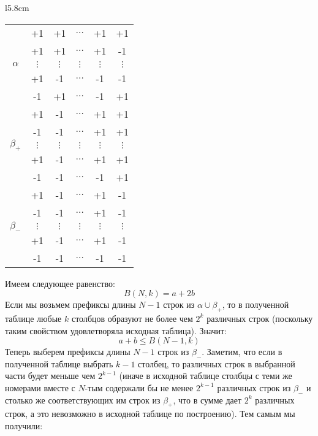 \begin{wraptable}{l}{5.8cm}
  \begin{tabular}{|c|c c c c|c|}
    \hline
    \multirow{5}{*}{$\alpha$} & +1 & +1 & $\ldots$ & +1 & +1 \\
                              & +1 & +1 & $\ldots$ & +1 & -1 \\
                              & $\vdots$ & $\vdots$ & $\vdots$ & $\vdots$ & $\vdots$ \\
                              & +1 & -1 & $\ldots$ & -1 & -1 \\
                              & -1 & +1 & $\ldots$ & -1 & +1 \\
    \hline
    \multirow{5}{*}{$\beta_+$}& +1 & -1 & $\ldots$ & +1 & +1 \\
                              & -1 & -1 & $\ldots$ & +1 & +1 \\
                              & $\vdots$ & $\vdots$ & $\vdots$ & $\vdots$& $\vdots$ \\
                              & +1 & -1 & $\ldots$ & +1 & +1 \\
                              & -1 & -1 & $\ldots$ & -1 & +1 \\
    \hline
    \multirow{5}{*}{$\beta_-$}& +1 & -1 & $\ldots$ & +1 & -1 \\
                              & -1 & -1 & $\ldots$ & +1 & -1 \\
                              & $\vdots$ & $\vdots$ & $\vdots$ & $\vdots$  & $\vdots$ \\
                              & +1 & -1 & $\ldots$ & +1 & -1 \\
                              & -1 & -1 & $\ldots$ & -1 & -1 \\
    \hline
  \end{tabular}
\end{wraptable}
Имеем следующее равенство:
$$B(N,k)=a+2b$$
Если мы возьмем префиксы длины $N-1$ строк из $\alpha\cup\beta_+$, то в полученной таблице любые $k$ столбцов образуют не более чем $2^k$ различных строк (поскольку таким свойством удовлетворяла исходная таблица). Значит:  
$$a+b\le B(N-1,k)$$
Теперь выберем префиксы длины $N-1$ строк из $\beta_-$. Заметим, что если в полученной таблице выбрать $k-1$ столбец, то различных строк в выбранной части будет меньше чем $2^{k-1}$ (иначе в исходной таблице столбцы с теми же номерами вместе с $N$-тым содержали бы не менее $2^{k-1}$ различных строк из $\beta_-$ и столько же соответствующих им строк из $\beta_+$, что в сумме дает $2^k$ различных строк, а это невозможно в исходной таблице по построению). Тем самым мы получили:
